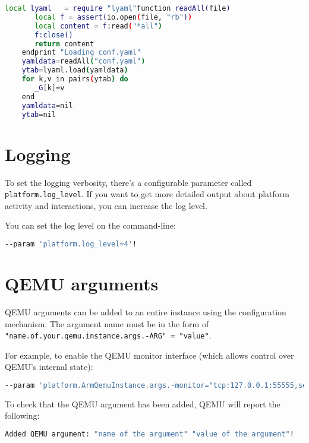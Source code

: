 \small
\begin{lstlisting}[language=bash]
    local lyaml   = require "lyaml"function readAll(file)
       local f = assert(io.open(file, "rb"))
       local content = f:read("*all")
       f:close()
       return content
    endprint "Loading conf.yaml"
    yamldata=readAll("conf.yaml")
    ytab=lyaml.load(yamldata)
    for k,v in pairs(ytab) do
       _G[k]=v
    end
    yamldata=nil
    ytab=nil
\end{lstlisting}
\normalsize


\clearpage
\section{Logging}
\label{sec:logging}

To set the logging verbosity, there's a configurable parameter called
{\small{\lstinline!platform.log_level!}}.  If you want to get more
detailed output about platform activity and interactions, you can
increase the log level.

You can set the log level on the command-line:
\small
\begin{lstlisting}[language=bash]
    --param 'platform.log_level=4'!
\end{lstlisting}
\normalsize



\section{QEMU arguments}
\label{sec:qemuArguments}

QEMU arguments can be added to an entire instance using the configuration mechanism. The argument name must be in the form of {\small{\lstinline!"name.of.your.qemu.instance.args.-ARG" = "value"!}}.

For example, to enable the QEMU monitor interface (which allows control over QEMU's internal state):

\small
\begin{lstlisting}[language=bash]
    --param 'platform.ArmQemuInstance.args.-monitor="tcp:127.0.0.1:55555,server,nowait"'!
\end{lstlisting}
\normalsize

To check that the QEMU argument has been added, QEMU will report the following:

\small
\begin{lstlisting}[language=bash]
    Added QEMU argument: "name of the argument" "value of the argument"!
\end{lstlisting}
\normalsize

